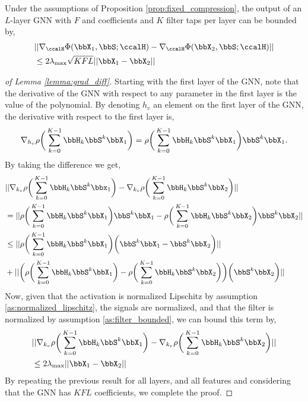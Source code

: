 \begin{lemma}\label{lemma:grad_diff} Under the assumptions of Proposition \ref{prop:fixed_compression}, the output of an $L$-layer GNN with $F$ and coefficients and $K$ filter taps per layer can be bounded by,
	\begin{align}
		&||\nabla_\ccalH\Phi(\bbX_1,\bbS;\ccalH) - \nabla_\ccalH\Phi(\bbX_2,\bbS;\ccalH)  ||\\
  &\leq 2\lambda_{\max} \sqrt{KFL} ||\bbX_1-\bbX_2|| \nonumber
	\end{align}
\end{lemma}
\begin{proof}[of Lemma \ref{lemma:grad_diff}]
	Starting with the first layer of the GNN, note that the derivative of the GNN with respect to any parameter in the first layer is the value of the polynomial. By denoting $h_v$ an element on the first layer of the GNN, the derivative with respect to the first layer is, 
	\begin{align}
		\nabla_{h_v}\non\bigg(\sum_{k=0}^{K-1}\bbH_k \bbS^k\bbX_{1}\bigg)=\non\bigg(\sum_{k=0}^{K-1}\bbH_k \bbS^k\bbX_{1}\bigg)  \bbS^k\bbX_{1}.
	\end{align}
	By taking the difference we get, 
	\begin{align}
		&||\nabla_{k_v}\non\bigg(\sum_{k=0}^{K-1}\bbH_k \bbS^k\bbx_{1}\bigg)-\nabla_{k_v}\non\bigg(\sum_{k=0}^{K-1}\bbH_k \bbS^k\bbX_{2}\bigg)||\\
		&=||\non\bigg(\sum_{k=0}^{K-1}\bbH_k \bbS^k\bbX_{1}\bigg)  \bbS^k\bbX_{1}-\non\bigg(\sum_{k=0}^{K-1}\bbH_k \bbS^k\bbX_{2}\bigg)  \bbS^k\bbX_{2}||\\
		&\leq ||\non\bigg(\sum_{k=0}^{K-1}\bbH_k \bbS^k\bbX_{1}\bigg) \bigg(  \bbS^k\bbX_{1}- \bbS^k\bbX_{2}\bigg)||\\
		&+||\bigg(\non\bigg(\sum_{k=0}^{K-1}\bbH_k \bbS^k\bbX_{1}\bigg) -\non\bigg( \sum_{k=0}^{K-1}\bbH_k \bbS^k\bbX_{2}\bigg)\bigg)  \bigg( \bbS^k\bbX_{2}\bigg)||
	\end{align}
	Now, given that the activation is normalized Lipschitz by assumption \ref{as:normalized_lipschitz}, the signals are normalized, and that the filter is normalized by assumption \ref{as:filter_bounded}, we can bound this term by, 
	\begin{align}
		&||\nabla_{k_v}\non\bigg(\sum_{k=0}^{K-1}\bbH_k \bbS^k\bbX_{1}\bigg)-\nabla_{k_v}\non\bigg(\sum_{k=0}^{K-1}\bbH_k \bbS^k\bbX_{2}\bigg)||\nonumber\\
  &\leq 2 \lambda_{\max}||\bbX_1 - \bbX_2 || 
	\end{align}
	By repeating the previous result for all layers, and all features and considering that the GNN has $KFL$ coefficients, we complete the proof. 
\end{proof}

